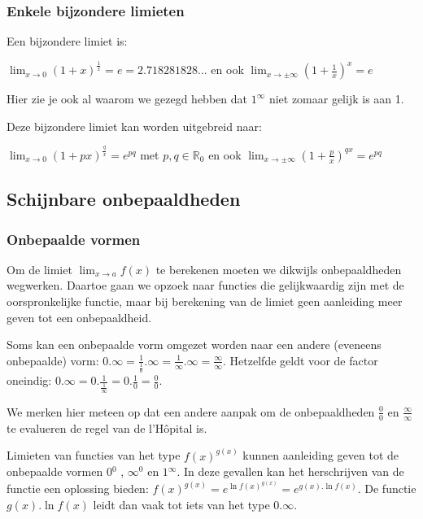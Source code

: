 \subsubsection{Enkele bijzondere limieten}

Een bijzondere limiet is:

${\displaystyle \lim_{x\to0}}\left(1+x\right)^{\frac{1}{x}}=e=2.718281828...$
en ook ${\displaystyle \lim_{x\to\pm\infty}}\left(1+\frac{1}{x}\right)^{x}=e$




Hier zie je ook al waarom we gezegd hebben dat $1^{\infty}$
niet zomaar gelijk is aan 1.




Deze bijzondere limiet kan worden uitgebreid naar:

${\displaystyle \lim_{x\to0}}\left(1+px\right)^{\frac{q}{x}}=e^{pq}$
met $p,q\in\mathbb{R}_{0}$ en ook ${\displaystyle \lim_{x\to\pm\infty}}\left(1+\frac{p}{x}\right)^{qx}=e^{pq}$


\subsection{Schijnbare onbepaaldheden}

\subsubsection{Onbepaalde vormen}

Om de limiet ${\displaystyle \lim_{x\to a}}f(x)$ te berekenen moeten
we dikwijls onbepaaldheden wegwerken. Daartoe gaan we opzoek naar
functies die gelijkwaardig zijn met de oorspronkelijke functie, maar
bij berekening van de limiet geen aanleiding meer geven tot een onbepaaldheid.

Soms kan een onbepaalde vorm omgezet worden naar een andere
(eveneens onbepaalde) vorm: ${\displaystyle 0.\infty=\frac{1}{\frac{1}{0}}.\infty=\frac{1}{\infty}.\infty=\frac{\infty}{\infty}}$.
Hetzelfde geldt voor de factor oneindig: ${\displaystyle 0.\infty=0.\frac{1}{\frac{1}{\infty}}=0.\frac{1}{0}=\frac{0}{0}}$.

We merken hier meteen op dat een andere aanpak om de onbepaaldheden
$\frac{0}{0}$ en $\frac{\infty}{\infty}$ te evalueren de regel van
de l'H\^opital is.

Limieten van functies van het type $f(x)^{g(x)}$ kunnen
aanleiding geven tot de onbepaalde vormen $0{}^{0}$ , $\infty{}^{0}$
en $1{}^{\infty}$. In deze gevallen kan het herschrijven van de functie
een oplossing bieden: ${\displaystyle f(x)^{g(x)}=e^{\ln f(x)^{g(x)}}=e^{g(x).\ln f(x)}}$.
De functie $g(x).\ln f(x)$ leidt dan vaak tot iets van het type $0.\infty$.


